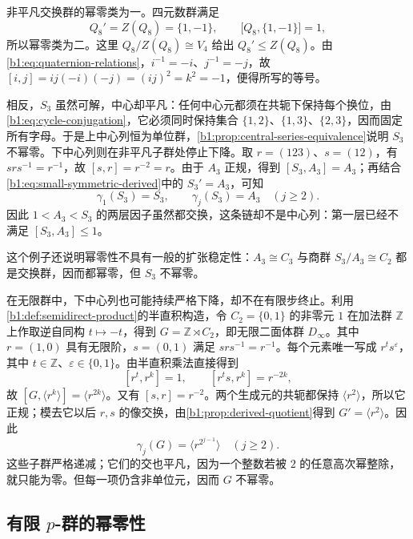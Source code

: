 \ProseParagraphBreak
非平凡交换群的幂零类为一。四元数群满足
\[
	Q_8'=Z(Q_8)=\{1,-1\},\qquad \bigl[Q_8,\{1,-1\}\bigr]=1,
\]
所以幂零类为二。这里 \(Q_8/Z(Q_8)\cong V_4\) 给出 \(Q_8'\le Z(Q_8)\)。由\eqref{b1:eq:quaternion-relations}，\(i^{-1}=-i\)、\(j^{-1}=-j\)，故 \([i,j]=ij(-i)(-j)=(ij)^2=k^2=-1\)，便得所写的等号。

\ProseParagraphBreak
相反，\(S_3\) 虽然可解，中心却平凡：任何中心元都须在共轭下保持每个换位，由\eqref{b1:eq:cycle-conjugation}，它必须同时保持集合 \(\{1,2\}\)、\(\{1,3\}\)、\(\{2,3\}\)，因而固定所有字母。于是上中心列恒为单位群，\cref{b1:prop:central-series-equivalence}说明 \(S_3\) 不幂零。下中心列则在非平凡子群处停止下降。取 \(r=(123)\)、\(s=(12)\)，有 \(srs^{-1}=r^{-1}\)，故 \([s,r]=r^{-2}=r\)。由于 \(A_3\) 正规，得到 \([S_3,A_3]=A_3\)；再结合\eqref{b1:eq:small-symmetric-derived}中的 \(S_3'=A_3\)，可知
\[
	\gamma_1(S_3)=S_3,\qquad \gamma_j(S_3)=A_3\quad(j\ge2).
\]
因此 \(1<A_3<S_3\) 的两层因子虽然都交换，这条链却不是中心列：第一层已经不满足 \([S_3,A_3]\le1\)。

\ProseParagraphBreak
这个例子还说明幂零性不具有一般的扩张稳定性：\(A_3\cong C_3\) 与商群 \(S_3/A_3\cong C_2\) 都是交换群，因而都幂零，但 \(S_3\) 不幂零。

\ProseParagraphBreak
在无限群中，下中心列也可能持续严格下降，却不在有限步终止。利用\cref{b1:def:semidirect-product}的半直积构造，令 \(C_2=\{0,1\}\) 的非零元 \(1\) 在加法群 \(\mathbb Z\) 上作取逆自同构 \(t\mapsto-t\)，得到 \(G=\mathbb Z\rtimes C_2\)，即无限二面体群 \(D_\infty\)。其中 \(r=(1,0)\) 具有无限阶，\(s=(0,1)\) 满足 \(srs^{-1}=r^{-1}\)。每个元素唯一写成 \(r^ts^\varepsilon\)，其中 \(t\in\mathbb Z\)、\(\varepsilon\in\{0,1\}\)。由半直积乘法直接得到
\[
	[r^t,r^k]=1,\qquad [r^ts,r^k]=r^{-2k},
\]
故 \([G,\langle r^k\rangle]=\langle r^{2k}\rangle\)。又有 \([s,r]=r^{-2}\)。两个生成元的共轭都保持 \(\langle r^2\rangle\)，所以它正规；模去它以后 \(r,s\) 的像交换，由\cref{b1:prop:derived-quotient}得到 \(G'=\langle r^2\rangle\)。因此
\[
	\gamma_j(G)=\langle r^{2^{j-1}}\rangle\quad(j\ge2).
\]
这些子群严格递减；它们的交也平凡，因为一个整数若被 \(2\) 的任意高次幂整除，就只能为零。但每一项仍含非单位元，因而 \(G\) 不幂零。

\subsection{有限 \texorpdfstring{\(p\)}{p}-群的幂零性}
\label{b1:subsec:0703:02}


